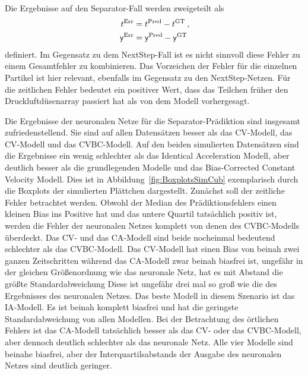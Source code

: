 Die Ergebnisse auf den Separator-Fall werden zweigeteilt als
\begin{align*}
    t{^{\text{Err}}} &=  t{^{\text{Pred}}} -  t{^{\text{GT}}} \: ,\\
    \mathsf{y}{^{\text{Err}}} &=  \mathsf{y}{^{\text{Pred}}} -  \mathsf{y}{^{\text{GT}}}
\end{align*}
definiert.
Im Gegensatz zu dem NextStep-Fall ist es nicht sinnvoll diese Fehler zu einem Gesamtfehler zu kombinieren.
Das Vorzeichen der Fehler für die einzelnen Partikel ist hier relevant, ebenfalls im Gegensatz zu den NextStep-Netzen.
Für die zeitlichen Fehler bedeutet ein positiver Wert, 
dass das Teilchen früher den Druckluftdüsenarray passiert hat als von dem Modell vorhergesagt. 


Die Ergebnisse der neuronalen Netze für die Separator-Prädiktion sind insgesamt zufriedenstellend.
Sie sind auf allen Datensätzen besser als das CV-Modell, das CV-Modell und das CVBC-Modell.
Auf den beiden simulierten Datensätzen sind die Ergebnisse ein wenig schlechter als das Identical Acceleration Modell, 
aber deutlich besser als die grundlegenden Modelle und das Bias-Corrected Constant Velocity Modell.
Dies ist in Abbildung~\ref{fig:BoxplotsSimCub} exemplarisch durch die Boxplots der simulierten Plättchen dargestellt.
Zunächst soll der zeitliche Fehler betrachtet werden.
Obwohl der Median des Prädiktionsfehlers einen kleinen Bias ins Positive hat und das untere Quartil tatsächlich positiv ist, werden die Fehler der neuronalen Netzes komplett von denen des CVBC-Modells überdeckt.
Das CV- und das CA-Modell sind beide nocheinmal bedeutend schlechter als das CVBC-Modell.
Das CV-Modell hat einen Bias von beinah zwei ganzen Zeitschritten während das CA-Modell zwar beinah biasfrei ist, ungefähr in der gleichen Größenordnung wie das neuronale Netz, hat es mit Abstand die größte Standardabweichung
Diese ist ungefähr drei mal so groß wie die des Ergebnisses des neuronalen Netzes.
Das beste Modell in diesem Szenario ist das IA-Modell.
Es ist beinah komplett biasfrei und hat die geringste Standardabweichung von allen Modellen.
Bei der Betrachtung des örtlichen Fehlers ist das CA-Modell tatsächlich besser als das CV- oder das CVBC-Modell, aber dennoch deutlich schlechter als das neuronale Netz.
Alle vier Modelle sind beinahe biasfrei, aber der Interquartilsabstands der Ausgabe des neuronalen Netzes sind deutlich geringer. 

